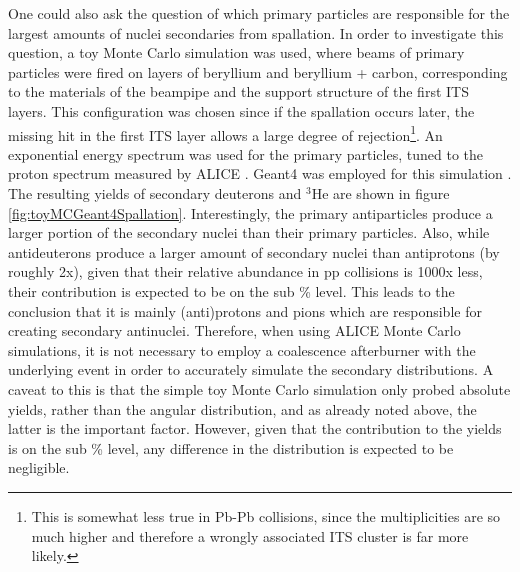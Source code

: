 One could also ask the question of which primary particles are responsible for the largest amounts of nuclei secondaries from spallation. In order to investigate this question, a toy Monte Carlo simulation was used, where beams of primary particles were fired on layers of beryllium and beryllium + carbon, corresponding to the materials of the beampipe and the support structure of the first ITS layers. This configuration was chosen since if the spallation occurs later, the missing hit in the first ITS layer allows a large degree of rejection\footnote{This is somewhat less true in Pb-Pb collisions, since the multiplicities are so much higher and therefore a wrongly associated ITS cluster is far more likely.}. An exponential energy spectrum was used for the primary particles, tuned to the proton spectrum measured by ALICE \cite{Aamodt:2010dx}. Geant4 was employed for this simulation \cite{GEANT4:2002zbu, Geant4_developments}. The resulting yields of secondary deuterons and $^3\mathrm{He}$ are shown in figure \ref{fig:toyMCGeant4Spallation}. Interestingly, the primary antiparticles produce a larger portion of the secondary nuclei than their primary particles. Also, while antideuterons produce a larger amount of secondary nuclei than antiprotons (by roughly 2x), given that their relative abundance in pp collisions is 1000x less, their contribution is expected to be on the sub \% level. This leads to the conclusion that it is mainly (anti)protons and pions which are responsible for creating secondary antinuclei. Therefore, when using ALICE Monte Carlo simulations, it is not necessary to employ a coalescence afterburner with the underlying event in order to accurately simulate the secondary distributions. A caveat to this is that the simple toy Monte Carlo simulation only probed absolute yields, rather than the angular distribution, and as already noted above, the latter is the important factor. However, given that the contribution to the yields is on the sub \% level, any difference in the distribution is expected to be negligible. 

